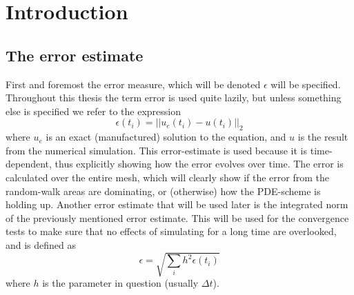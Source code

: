 
\section{Introduction}
\subsection{The error estimate}\label{error_estimate}
First and foremost the error measure, which will be denoted $\epsilon$ will be specified.
Throughout this thesis the term error is used quite lazily, but unless something else is specified we refer to the expression 
\begin{equation}
 \epsilon(t_i) = ||u_e(t_i)-u(t_i)||_2
\end{equation}
where $u_e$ is an exact (manufactured) solution to the equation, and $u$ is the result from the numerical simulation. 
This error-estimate is used because it is time-dependent, thus explicitly showing how the error evolves over time. 
The error is calculated over the entire mesh, which will clearly show if the error from the random-walk areas are dominating, or (otherwise) how the PDE-scheme is holding up.
Another error estimate that will be used later is the integrated norm of the previously mentioned error estimate. 
This will be used for the convergence tests to make sure that no effects of simulating for a long time are overlooked, and is defined as 
\begin{equation}
 \epsilon = \sqrt{\sum\limits_i h^2\epsilon(t_i)}
\end{equation}
where $h$ is the parameter in question (usually $\Delta t$).

